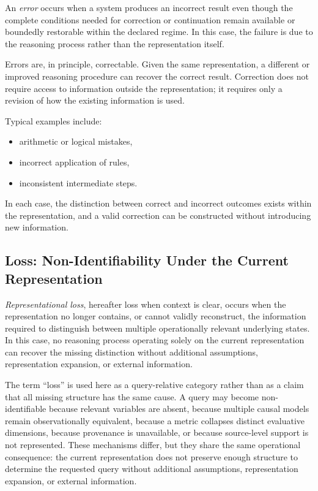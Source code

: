 \documentclass[11pt]{article}
\begin{document}
An \emph{error} occurs when a system produces an incorrect result even though the complete conditions needed for correction or continuation remain available or boundedly restorable within the declared regime. In this case, the failure is due to the reasoning process rather than the representation itself.

Errors are, in principle, correctable. Given the same representation, a different or improved reasoning procedure can recover the correct result. Correction does not require access to information outside the representation; it requires only a revision of how the existing information is used.

Typical examples include:
\begin{itemize}[leftmargin=1.5em]
    \item arithmetic or logical mistakes,
    \item incorrect application of rules,
    \item inconsistent intermediate steps.
\end{itemize}

In each case, the distinction between correct and incorrect outcomes exists within the representation, and a valid correction can be constructed without introducing new information.

\subsection{Loss: Non-Identifiability Under the Current Representation}

\emph{Representational loss}, hereafter loss when context is clear, occurs when the representation no longer contains, or cannot validly reconstruct, the information required to distinguish between multiple operationally relevant underlying states. In this case, no reasoning process operating solely on the current representation can recover the missing distinction without additional assumptions, representation expansion, or external information.

The term ``loss'' is used here as a query-relative category rather than as a claim that all missing structure has the same cause. A query may become non-identifiable because relevant variables are absent, because multiple causal models remain observationally equivalent, because a metric collapses distinct evaluative dimensions, because provenance is unavailable, or because source-level support is not represented. These mechanisms differ, but they share the same operational consequence: the current representation does not preserve enough structure to determine the requested query without additional assumptions, representation expansion, or external information.
\end{document}
